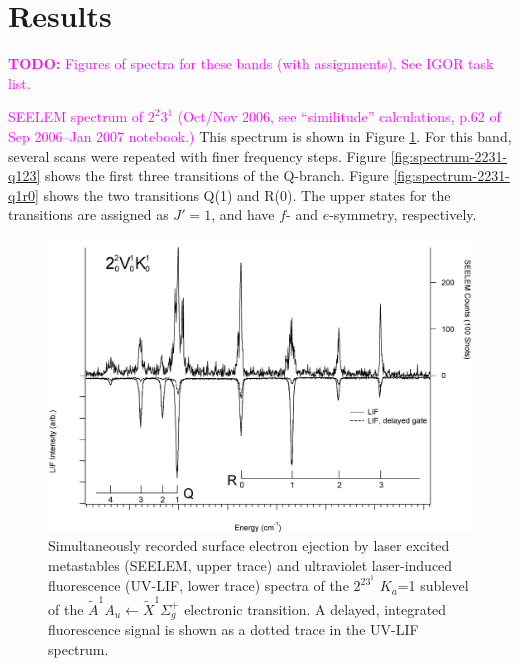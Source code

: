 \documentclass[12pt]{mitthesis}
\newcommand{\TODO} [1]{\textcolor{magenta}{\textbf{TODO:} #1}}
\newcommand{\POINT}[1]{\textcolor{magenta}{#1}}
\begin{document}
\section{Results}

\TODO{Figures of spectra for these bands (with assignments). See IGOR
  task list.}

\POINT{SEELEM spectrum of $2^2 3^1$ (Oct/Nov 2006, see ``similitude''
  calculations, p.62 of Sep 2006--Jan 2007 notebook.)}  This spectrum
is shown in Figure \ref{fig:spectrum-2231}.  For this band, several
scans were repeated with finer frequency steps.  Figure
\ref{fig:spectrum-2231-q123} shows the first three transitions of the
Q-branch.  Figure \ref{fig:spectrum-2231-q1r0} shows the two
transitions Q(1) and R(0).  The upper states for the transitions are
assigned as $J'=1$, and have $f$- and $e$-symmetry, respectively.

\begin{figure}
  \caption{
    Simultaneously recorded surface electron ejection by laser excited
    metastables (SEELEM, upper trace) and ultraviolet laser-induced
    fluorescence (UV-LIF, lower trace) spectra of the $2^23^1$ $K_a$=1
    sublevel of the $\tilde{A}^1A_u \leftarrow \tilde{X} ^1\Sigma_g^+$
    electronic transition. A delayed, integrated fluorescence signal
    is shown as a dotted trace in the UV-LIF spectrum.}
  \label{fig:spectrum-2231}
  \centering
  \includegraphics[width=8in,angle=90]{spectrum-2231.png}
\end{figure}
\end{document}
